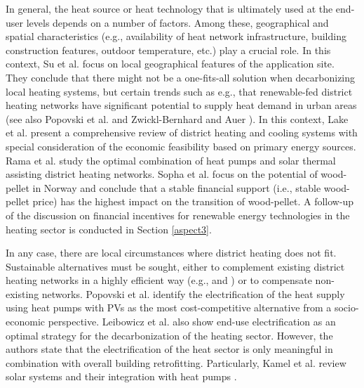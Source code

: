 In general, the heat source or heat technology that is ultimately used at the end-user levels depends on a number of factors. Among these, geographical and spatial characteristics (e.g., availability of heat network infrastructure, building construction features, outdoor temperature, etc.) play a crucial role. In this context, Su et al. \cite{su2018heating} focus on local geographical features of the application site. They conclude that there might not be a one-fits-all solution when decarbonizing local heating systems, but certain trends such as e.g., that renewable-fed district heating networks have significant potential to supply heat demand in urban areas (see also Popovski et al. \cite{popovski2018technical} and Zwickl-Bernhard and Auer \cite{zwickl2022demystifying}). In this context, Lake et al. \cite{lake2017review} present a comprehensive review of district heating and cooling systems with special consideration of the economic feasibility based on primary energy sources. Rama et al. \cite{rama2018introduction} study the optimal combination of heat pumps and solar thermal assisting district heating networks. Sopha et al. \cite{sopha2011exploring} focus on the potential of wood-pellet in Norway and conclude that a stable financial support (i.e., stable wood-pellet price) has the highest impact on the transition of wood-pellet. A follow-up of the discussion on financial incentives for renewable energy technologies in the heating sector is conducted in Section \ref{aspect3}.\vspace{0.5cm}

In any case, there are local circumstances where district heating does not fit. Sustainable alternatives must be sought, either to complement existing district heating networks in a highly efficient way (e.g., \cite{rama2018introduction} and \cite{sopha2011exploring}) or to compensate non-existing networks. Popovski et al. \cite{popovski2018technical} identify the electrification of the heat supply using heat pumps with PVs as the most cost-competitive alternative from a socio-economic perspective. Leibowicz et al. \cite{leibowicz2018optimal} also show end-use electrification as an optimal strategy for the decarbonization of the heating sector. However, the authors state that the electrification of the heat sector is only meaningful in combination with overall building retrofitting. Particularly, Kamel et al. review solar systems and their integration with heat pumps \cite{kamel2015solar}.\vspace{0.5cm}

